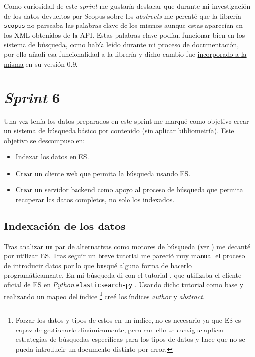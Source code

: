 Como curiosidad de este \textit{sprint} me gustaría destacar que durante mi investigación de los datos devueltos por Scopus sobre los \textit{abstracts} me percaté que la librería \texttt{scopus} no parseaba las palabras clave de los mismos aunque estas aparecían en los \acrshort{XML} obtenidos de la \acrshort{API}. Estas palabras clave podían funcionar bien en los sistema de búsqueda, como había leído durante mi proceso de documentación, por ello añadí esa funcionalidad a la librería y dicho cambio fue \href{https://github.com/scopus-api/scopus/pull/68}{incorporado a la misma} en su versión 0.9.

\section{\textit{Sprint} 6}
Una vez tenía los datos preparados en este sprint me marqué como objetivo crear un sistema de búsqueda básico por contenido (sin aplicar bibliometría). Este objetivo se descompuso en:
\begin{itemize}
	\item Indexar los datos en \acrlong{ES}.
	\item Crear un cliente web que permita la búsqueda usando \acrshort{ES}.
	\item Crear un servidor \gls{backend} como apoyo al proceso de búsqueda que permita recuperar los datos completos, no solo los indexados.
\end{itemize}

\subsection{Indexación de los datos}
Tras analizar un par de alternativas como motores de búsqueda (ver ) me decanté por utilizar \acrshort{ES}. Tras seguir un breve tutorial me pareció muy manual el proceso de introducir datos por lo que busqué alguna forma de hacerlo programáticamente. En mi búsqueda di con el tutorial \cite{indexingES}, que utilizaba el cliente oficial de \acrshort{ES} en \textit{Python} \texttt{elasticsearch-py} \cite{ES_client}. Usando dicho tutorial como base y realizando un mapeo del índice \footnote[4]{Forzar los datos y tipos de estos en un índice, no es necesario ya que \acrshort{ES} es capaz de gestionarlo dinámicamente, pero con ello se consigue aplicar estrategias de búsquedas específicas para los tipos de datos y hace que no se pueda introducir un documento distinto por error.}\cite{mappingES} creé los índices \textit{author} y \textit{abstract}.

